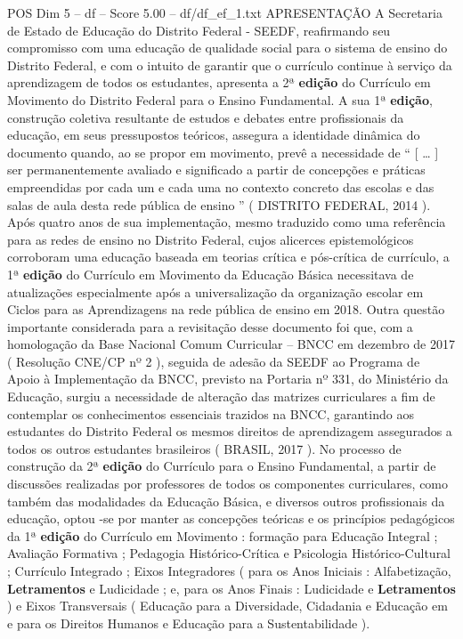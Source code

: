 \begin{textsample}{POS Dim 5 – df – Score 5.00 – df/df\_ef\_1.txt}  \label{ex:f5_pos_155}
APRESENTAÇÃO A Secretaria de Estado de Educação do Distrito Federal - SEEDF, reafirmando seu compromisso com uma educação de qualidade social para o sistema de ensino do Distrito Federal, e com o intuito de garantir que o currículo continue à serviço da aprendizagem de todos os estudantes, apresenta a 2ª \textbf{edição} do Currículo em Movimento do Distrito Federal para o Ensino Fundamental.
A sua 1ª \textbf{edição}, construção coletiva resultante de estudos e debates entre profissionais da educação, em seus pressupostos teóricos, assegura a identidade dinâmica do documento quando, ao se propor em movimento, prevê a necessidade de “ [ … ] ser permanentemente avaliado e significado a partir de concepções e práticas empreendidas por cada um e cada uma no contexto concreto das escolas e das salas de aula desta rede pública de ensino ” ( DISTRITO FEDERAL, 2014 ).
Após quatro anos de sua implementação, mesmo traduzido como uma referência para as redes de ensino no Distrito Federal, cujos alicerces epistemológicos corroboram uma educação baseada em teorias crítica e pós-crítica de currículo, a 1ª \textbf{edição} do Currículo em Movimento da Educação Básica necessitava de atualizações especialmente após a universalização da organização escolar em Ciclos para as Aprendizagens na rede pública de ensino em 2018.
Outra questão importante considerada para a revisitação desse documento foi que, com a homologação da Base Nacional Comum Curricular – BNCC em dezembro de 2017 ( Resolução CNE/CP nº 2 ), seguida de adesão da SEEDF ao Programa de Apoio à Implementação da BNCC, previsto na Portaria nº 331, do Ministério da Educação, surgiu a necessidade de alteração das matrizes curriculares a fim de contemplar os conhecimentos essenciais trazidos na BNCC, garantindo aos estudantes do Distrito Federal os mesmos direitos de aprendizagem assegurados a todos os outros estudantes brasileiros ( BRASIL, 2017 ).
No processo de construção da 2ª \textbf{edição} do Currículo para o Ensino Fundamental, a partir de discussões realizadas por professores de todos os componentes curriculares, como também das modalidades da Educação Básica, e diversos outros profissionais da educação, optou -se por manter as concepções teóricas e os princípios pedagógicos da 1ª \textbf{edição} do Currículo em Movimento : formação para Educação Integral ; Avaliação Formativa ; Pedagogia Histórico-Crítica e Psicologia Histórico-Cultural ; Currículo Integrado ; Eixos Integradores ( para os Anos Iniciais : Alfabetização, \textbf{Letramentos} e Ludicidade ; e, para os Anos Finais : Ludicidade e \textbf{Letramentos} ) e Eixos Transversais ( Educação para a Diversidade, Cidadania e Educação em e para os Direitos Humanos e Educação para a Sustentabilidade ).

\end{textsample}
